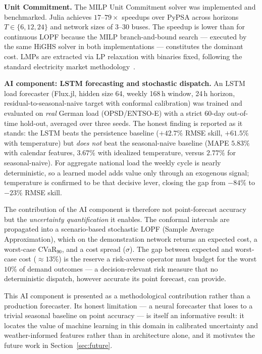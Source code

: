 \textbf{Unit Commitment.}
The MILP Unit Commitment solver was implemented and benchmarked. Julia achieves $17$--$79\times$ speedups over PyPSA across horizons $T \in \{6, 12, 24\}$ and network sizes of 3--30 buses. The speedup is lower than for continuous LOPF because the MILP branch-and-bound search --- executed by the same HiGHS solver in both implementations --- constitutes the dominant cost. LMPs are extracted via LP relaxation with binaries fixed, following the standard electricity market methodology~\cite{oneill2005}.

\textbf{AI component: LSTM forecasting and stochastic dispatch.}
An LSTM load forecaster (Flux.jl, hidden size 64, weekly 168\,h window, 24\,h horizon, residual-to-seasonal-naive target with conformal calibration) was trained and evaluated on \emph{real} German load (OPSD/ENTSO-E) with a strict 60-day out-of-time hold-out, averaged over three seeds. The honest finding is reported as it stands: the LSTM beats the persistence baseline ($+42.7\%$ RMSE skill, $+61.5\%$ with temperature) but \emph{does not} beat the seasonal-naive baseline (MAPE $5.83\%$ with calendar features, $3.67\%$ with idealized temperature, versus $2.77\%$ for seasonal-naive). For aggregate national load the weekly cycle is nearly deterministic, so a learned model adds value only through an exogenous signal; temperature is confirmed to be that decisive lever, closing the gap from $-84\%$ to $-23\%$ RMSE skill.

The contribution of the AI component is therefore not point-forecast accuracy but the \emph{uncertainty quantification} it enables. The conformal intervals are propagated into a scenario-based stochastic LOPF (Sample Average Approximation), which on the demonstration network returns an expected cost, a worst-case CVaR$_{90}$, and a cost spread ($\sigma$). The gap between expected and worst-case cost ($\approx 13\%$) is the reserve a risk-averse operator must budget for the worst $10\%$ of demand outcomes --- a decision-relevant risk measure that no deterministic dispatch, however accurate its point forecast, can provide.

This AI component is presented as a methodological contribution rather than a production forecaster. Its honest limitation --- a neural forecaster that loses to a trivial seasonal baseline on point accuracy --- is itself an informative result: it locates the value of machine learning in this domain in calibrated uncertainty and weather-informed features rather than in architecture alone, and it motivates the future work in Section~\ref{sec:future}.

